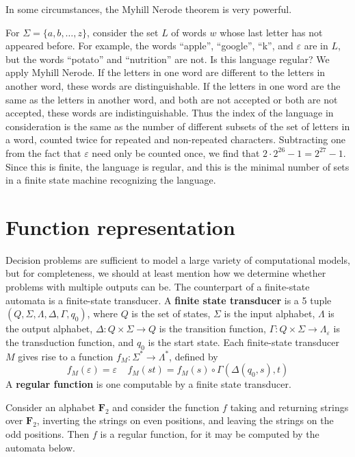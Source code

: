 In some circumstances, the Myhill Nerode theorem is very powerful.

\begin{example}
    For $\Sigma = \{ a, b, \dots, z \}$, consider the set $L$ of words $w$ whose last letter has not appeared before. For example, the words ``apple'', ``google'', ``k'', and $\varepsilon$ are in $L$, but the words ``potato'' and ``nutrition'' are not. Is this language regular? We apply Myhill Nerode. If the letters in one word are different to the letters in another word, these words are distinguishable. If the letters in one word are the same as the letters in another word, and both are not accepted or both are not accepted, these words are indistinguishable. Thus the index of the language in consideration is the same as the number of different subsets of the set of letters in a word, counted twice for repeated and non-repeated characters. Subtracting one from the fact that $\varepsilon$ need only be counted once, we find that $2 \cdot 2^{26} - 1 = 2^{27} - 1$. Since this is finite, the language is regular, and this is the minimal number of sets in a finite state machine recognizing the language.
\end{example}

\section{Function representation}

Decision problems are sufficient to model a large variety of computational models, but for completeness, we should at least mention how we determine whether problems with multiple outputs can be. The counterpart of a finite-state automata is a finite-state transducer. A {\bf finite state transducer} is a 5 tuple $(Q, \Sigma, \Lambda, \Delta, \Gamma, q_0)$, where $Q$ is the set of states, $\Sigma$ is the input alphabet, $\Lambda$ is the output alphabet, $\Delta: Q \times \Sigma \to Q$ is the transition function, $\Gamma: Q \times \Sigma \to \Lambda_\varepsilon$ is the transduction function, and $q_0$ is the start state. Each finite-state transducer $M$ gives rise to a function $f_M: \Sigma^* \to \Lambda^*$, defined by
%
\[ f_M(\varepsilon) = \varepsilon\ \ \ \ \ f_M(st) = f_M(s) \circ \Gamma(\Delta(q_0,s), t) \]
%
A {\bf regular function} is one computable by a finite state transducer.

\begin{example}
    Consider an alphabet $\mathbf{F}_2$ and consider the function $f$ taking and returning strings over $\mathbf{F}_2$, inverting the strings on even positions, and leaving the strings on the odd positions. Then $f$ is a regular function, for it may be computed by the automata below.
\end{example}










